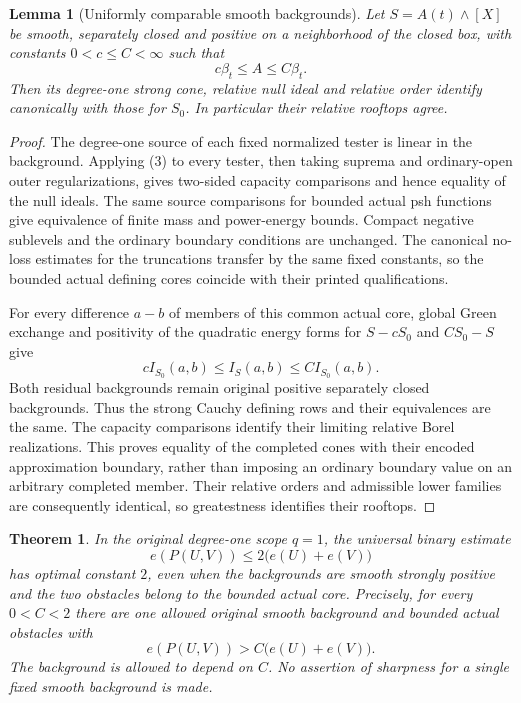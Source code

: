 \documentclass{article}
\newtheorem{lemma}{Lemma}
\newtheorem{theorem}{Theorem}
\begin{document}
\begin{lemma}[Uniformly comparable smooth backgrounds]
Let $S=A(t)\wedge[X]$ be smooth, separately closed and positive on a
neighborhood of the closed box, with constants $0<c\le C<\infty$ such that
\[
                    c\beta_t\le A\le C\beta_t.             \tag{3}
\]
Then its degree-one strong cone, relative null ideal and relative order
identify canonically with those for $S_0$. In particular their relative
rooftops agree.
\end{lemma}
\begin{proof}
The degree-one source of each fixed normalized tester is linear in the
background. Applying (3) to every tester, then taking suprema and ordinary-open
outer regularizations, gives two-sided capacity comparisons and hence
equality of the null ideals. The same source
comparisons for bounded actual psh functions give equivalence of finite
mass and power-energy bounds. Compact negative sublevels and the ordinary
boundary conditions are unchanged. The canonical no-loss estimates for
the truncations transfer by the same fixed constants, so the bounded
actual defining cores coincide with their printed qualifications.

For every difference $a-b$ of members of this common actual core, global
Green exchange and positivity of the quadratic energy forms for
$S-cS_0$ and $CS_0-S$ give
\[
 c I_{S_0}(a,b)\le I_S(a,b)\le C I_{S_0}(a,b).              \tag{4}
\]
Both residual backgrounds remain original positive separately closed
backgrounds. Thus the strong Cauchy defining rows and their equivalences
are the same. The capacity comparisons identify their limiting relative
Borel realizations. This proves equality of the completed cones with
their encoded approximation boundary, rather than imposing an ordinary
boundary value on an arbitrary completed member. Their relative orders
and admissible lower families are consequently identical, so greatestness
identifies their rooftops.
\end{proof}

\begin{theorem}
In the original degree-one scope $q=1$, the universal binary estimate
\[
                       e(P(U,V))\le2\bigl(e(U)+e(V)\bigr)
\]
has optimal constant $2$, even when the backgrounds are smooth strongly
positive and the two obstacles belong to the bounded actual core.
Precisely, for every $0<C<2$ there are one allowed original smooth
background and bounded actual obstacles with
\[
                       e(P(U,V))>C\bigl(e(U)+e(V)\bigr).
\]
The background is allowed to depend on $C$. No assertion of sharpness
for a single fixed smooth background is made.
\end{theorem}
\end{document}
